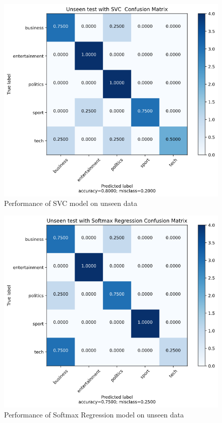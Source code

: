 \documentclass{article}
\begin{document}
  \renewcommand{\thefigure}{5.3.}
		\begin{figure}[H]
				\centerline{\includegraphics[scale=.4]{./UNSEEN_SVC.png}}
					\caption{Performance of SVC model on unseen data}
				\end{figure}

  \renewcommand{\thefigure}{5.4.}
		\begin{figure}[H]
				\centerline{\includegraphics[scale=.4]{./UNSEEN_SOFT.png}}
					\caption{Performance of Softmax Regression model on unseen data}
				\end{figure}
\end{document}
